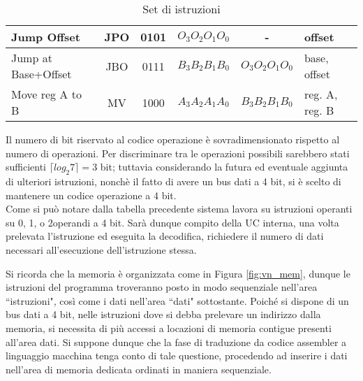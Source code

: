 \begin{table}[H]
\begin{tabular}{|p{0.5cm}|p{0.5cm}|p{0.5cm}|p{0.5cm}|p{0.5cm}|p{0.5cm}|}
		\multicolumn{1}{|l|}{Jump Offset}	&
		\multicolumn{1}{|c|}{JPO}  &
		\multicolumn{1}{|c|}{0101}	&
		\multicolumn{1}{|c|}{$O_3O_2O_1O_0$} &
		\multicolumn{1}{|c|}{-} &
		\multicolumn{1}{|l|}{offset}	\\ \hline
		
		\multicolumn{1}{|l|}{Jump at Base+Offset}	&
		\multicolumn{1}{|c|}{JBO}  &
		\multicolumn{1}{|c|}{0111}	&
		\multicolumn{1}{|c|}{$B_3B_2B_1B_0$} &
		\multicolumn{1}{|c|}{$O_3O_2O_1O_0$} &
		\multicolumn{1}{|l|}{base, offset}	\\ \hline
		
		\multicolumn{1}{|l|}{Move reg A to B}	&
		\multicolumn{1}{|c|}{MV}  &
		\multicolumn{1}{|c|}{1000}	&
		\multicolumn{1}{|c|}{$A_3A_2A_1A_0$} &
		\multicolumn{1}{|c|}{$B_3B_2B_1B_0$} &
		\multicolumn{1}{|l|}{reg. A, reg. B}	\\ \hline
	\end{tabular}
	\caption{Set di istruzioni}
\end{table} 		
\noindent
Il numero di bit riservato al codice operazione è sovradimensionato rispetto al numero di operazioni. Per discriminare tra le operazioni possibili sarebbero stati sufficienti $\lceil log_2{7} \rceil = 3$ bit; tuttavia considerando la futura ed eventuale aggiunta di ulteriori istruzioni, nonchè il fatto di avere un bus dati a 4 bit, si è scelto di mantenere un codice operazione a 4 bit.\\
Come si può notare dalla tabella precedente sistema lavora su istruzioni operanti su 0, 1, o 2operandi a 4 bit. Sarà dunque compito della UC interna, una volta prelevata l'istruzione ed eseguita la decodifica, richiedere il numero di dati necessari all'esecuzione dell'istruzione stessa.
\par \bigskip \noindent
Si ricorda che la memoria è organizzata come in Figura \ref{fig:vn_mem}, dunque le istruzioni del programma troveranno posto in modo sequenziale nell'area \textquotedblleft istruzioni", così come i dati nell'area \textquotedblleft dati" sottostante. 
Poiché si dispone di un bus dati a 4 bit, nelle istruzioni dove si debba prelevare un indirizzo dalla memoria, si necessita di più accessi a locazioni di memoria contigue presenti all'area dati.
Si suppone dunque che la fase di traduzione da codice assembler a linguaggio macchina tenga conto di tale questione, procedendo ad inserire i dati nell'area di memoria dedicata ordinati in maniera sequenziale.

